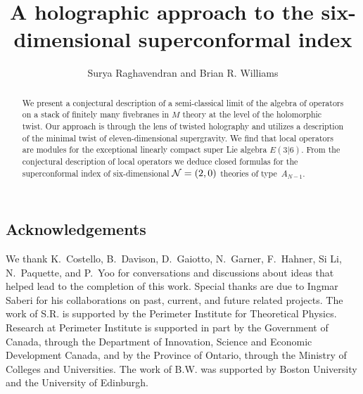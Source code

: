 \documentclass[11pt]{amsart}
\begin{document}
\title{A holographic approach to the six-dimensional superconformal index}
\author{Surya Raghavendran and Brian R. Williams}
\maketitle



\begin{abstract}
We present a conjectural description of a semi-classical limit of the algebra of operators on a stack of finitely many fivebranes in $M$ theory at the level of the holomorphic twist.
Our approach is through the lens of twisted holography and utilizes a description of the minimal twist of eleven-dimensional supergravity. 
We find that local operators are modules for the exceptional linearly compact super Lie algebra $E(3|6)$. 
From the conjectural description of local operators we deduce closed formulas for the superconformal index of six-dimensional $\mathcal N=(2,0)$ theories of type~$A_{N-1}$.
\end{abstract}

\setcounter{tocdepth}{1}
\tableofcontents



\subsection*{Acknowledgements}
We thank K.~Costello, B.~Davison, D.~Gaiotto, N.~Garner, F.~Hahner, Si Li, N.~Paquette, and P.~Yoo for conversations and discussions about ideas that helped lead to the completion of this work. 
Special thanks are due to Ingmar Saberi for his collaborations on past, current, and future related projects.
The work of S.R. is supported by the Perimeter Institute for Theoretical Physics. Research at Perimeter Institute is supported in part by the Government of Canada, through the Department of Innovation, Science and Economic Development Canada, and by the Province of Ontario, through the Ministry of Colleges and Universities.
The work of B.W. was supported by Boston University and the University of Edinburgh. 








 




\printbibliography
\end{document}
